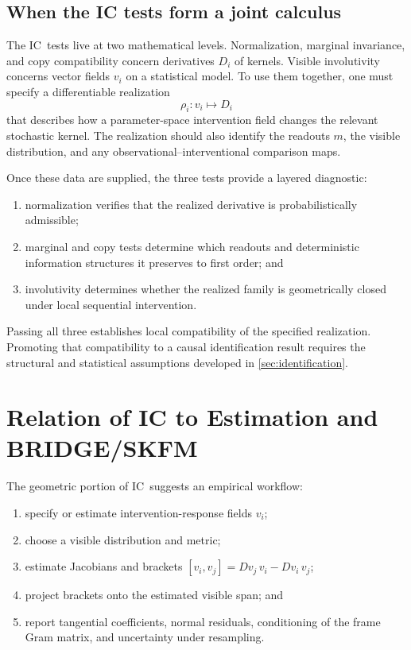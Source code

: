 \documentclass{article}
\theoremstyle{plain}
\theoremstyle{definition}
\theoremstyle{remark}
\newcommand{\IC}{\textsc{IC}}
\begin{document}
\subsection{When the \texorpdfstring{\IC}{IC} tests form a joint calculus}

The \IC\ tests live at two mathematical levels.  Normalization, marginal invariance,
and copy compatibility concern derivatives \(D_i\) of kernels.  Visible
involutivity concerns vector fields \(v_i\) on a statistical model.  To use them
together, one must specify a differentiable realization
\[
  \rho_i:v_i\longmapsto D_i
\]
that describes how a parameter-space intervention field changes the relevant
stochastic kernel.  The realization should also identify the readouts \(m\),
the visible distribution, and any observational--interventional comparison
maps.

Once these data are supplied, the three tests provide a layered diagnostic:
\begin{enumerate}[leftmargin=*,itemsep=3pt]
  \item normalization verifies that the realized derivative is probabilistically
        admissible;
  \item marginal and copy tests determine which readouts and deterministic
        information structures it preserves to first order; and
  \item involutivity determines whether the realized family is geometrically
        closed under local sequential intervention.
\end{enumerate}
Passing all three establishes local compatibility of the specified
realization.  Promoting that compatibility to a causal identification result
requires the structural and statistical assumptions developed in
\cref{sec:identification}.

\section{Relation of \texorpdfstring{\IC}{IC} to Estimation and BRIDGE/SKFM}
\label{sec:estimation}

The geometric portion of \IC\ suggests an empirical workflow:
\begin{enumerate}[leftmargin=*,itemsep=2pt]
  \item specify or estimate intervention-response fields \(v_i\);
  \item choose a visible distribution and metric;
  \item estimate Jacobians and brackets
        \([v_i,v_j]=Dv_j\,v_i-Dv_i\,v_j\);
  \item project brackets onto the estimated visible span; and
  \item report tangential coefficients, normal residuals, conditioning of the
        frame Gram matrix, and uncertainty under resampling.
\end{enumerate}
\end{document}
